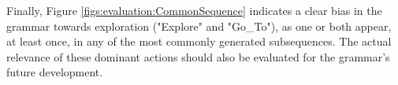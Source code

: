 Finally, Figure \ref{figs:evaluation:CommonSequence} indicates a clear bias in the grammar towards exploration ("Explore" and "Go\_To"), as one or both appear, at least once, in any of the most commonly generated subsequences. The actual relevance of these dominant actions should also be evaluated for the grammar's future development.















